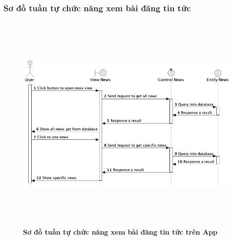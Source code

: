 \documentclass{article}%
\begin{document}
\subsubsection{Sơ đồ tuần tự chức năng xem bài đăng tin tức}
  \begin{figure}[H]
        \centering
        \includegraphics[width=16cm,height=11cm]{Images/mobile_app/view_news.png}
        \caption[ Sơ đồ tuần tự chức năng xem bài đăng tin tứctrên App]{\bfseries \fontsize{12pt}{0pt}
        \selectfont Sơ đồ tuần tự chức năng xem bài đăng tin tức trên App}
        \label{hinh21} %
  \end{figure}
\end{document}
